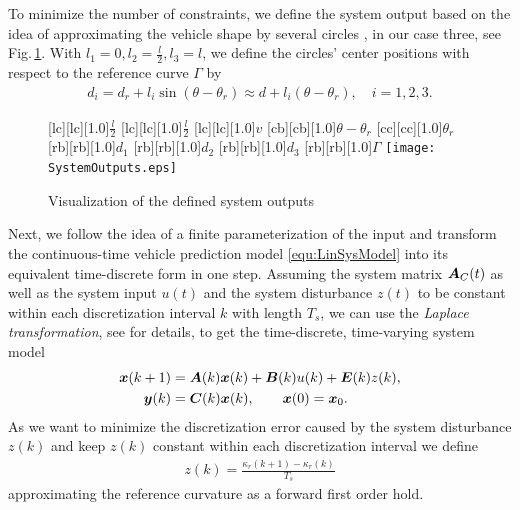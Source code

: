 To minimize the number of constraints, we define the system output based on the idea of approximating the vehicle shape by several circles  \cite{zieglerfastcollision2010}, in our case three, see Fig.\,\ref{fig:SystemOutputs}. With $l_1 = 0, l_2 = \tfrac{l}{2}, l_3 = l$, we define the circles' center positions with respect to the reference curve $\Gamma$ by
\begin{align}
	d_i = d_r + l_i \sin(\theta - \theta_r) \approx d + l_i(\theta - \theta_r), \quad i = 1, 2, 3.
	\label{equ:CCSystemOut}
\end{align}

\begin{figure}[h]
	[lc][lc][1.0]{$\tfrac{l}{2}$}
	[lc][lc][1.0]{$\tfrac{l}{2}$}
	[lc][lc][1.0]{$v$}
	[cb][cb][1.0]{$\theta-\theta_r$}
	[cc][cc][1.0]{$\theta_r$}
	[rb][rb][1.0]{$d_1$}
	[rb][rb][1.0]{$d_2$}
	[rb][rb][1.0]{$d_3$}
	[rb][rb][1.0]{$\Gamma$}
    \centering
    \texttt{[image: SystemOutputs.eps]}
    \caption{Visualization of the defined system outputs}
    \label{fig:SystemOutputs}
\end{figure}

Next, we follow the idea of a finite parameterization of the input and transform the continuous-time vehicle prediction model \eqref{equ:LinSysModel} into its equivalent time-discrete form in one step. Assuming the system matrix $\boldsymbol{A}_C(t)$ as well as the system input $u(t)$ and the system disturbance $z(t)$ to be constant within each discretization interval $k$ with length $T_s$, we can use the \textit{Laplace transformation}, see \cite{gutjahr2016lateral} for details, to get the time-discrete, time-varying system model
\begin{align}
	\begin{aligned}
		\vektor x(k+1) &= \mat A(k) \vektor x(k) + \mat B(k) u(k) + \mat E(k) z(k), \\
						\vektor y(k) &= \mat C(k) \vektor x(k),\quad \quad \bs x(0) = \bs x_0. 
	\end{aligned}
	\label{equ:DisPreMod}
\end{align}
As we want to minimize the discretization error caused by the system disturbance $z(k)$ and keep $z(k)$ constant within each discretization interval we define
\begin{align}
	z(k) = \frac{\kappa_r(k+1) - \kappa_r(k)}{T_s}
	\label{equ:FFOHkappaR}
\end{align}
approximating the reference curvature as a forward first order hold.


